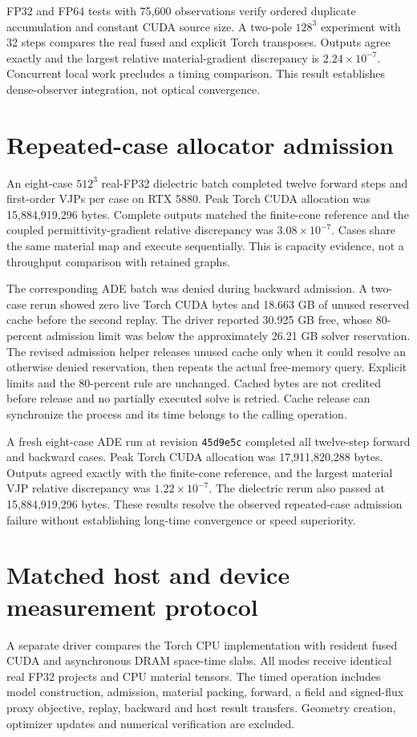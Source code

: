 \documentclass[11pt,a4paper]{article}
\begin{document}
FP32 and FP64 tests with 75,600 observations verify ordered duplicate
accumulation and constant CUDA source size. A two-pole $128^3$ experiment
with 32 steps compares the real fused and explicit Torch transposes. Outputs
agree exactly and the largest relative material-gradient discrepancy is
$2.24\times10^{-7}$. Concurrent local work precludes a timing comparison.
This result establishes dense-observer integration, not optical convergence.


\section{Repeated-case allocator admission}
An eight-case $512^3$ real-FP32 dielectric batch completed twelve forward steps
and first-order VJPs per case on RTX 5880. Peak Torch CUDA allocation was
15,884,919,296 bytes. Complete outputs matched the finite-cone reference and
the coupled permittivity-gradient relative discrepancy was
$3.08\times10^{-7}$. Cases share the same material map and execute sequentially.
This is capacity evidence, not a throughput comparison with retained graphs.

The corresponding ADE batch was denied during backward admission. A two-case
rerun showed zero live Torch CUDA bytes and 18.663 GB of unused reserved cache
before the second replay. The driver reported 30.925 GB free, whose 80-percent
admission limit was below the approximately 26.21 GB solver reservation.
The revised admission helper releases unused cache only when it could resolve
an otherwise denied reservation, then repeats the actual free-memory query.
Explicit limits and the 80-percent rule are unchanged. Cached bytes are not
credited before release and no partially executed solve is retried. Cache
release can synchronize the process and its time belongs to the calling operation.

A fresh eight-case ADE run at revision \texttt{45d9e5c} completed all twelve-step
forward and backward cases. Peak Torch CUDA allocation was 17,911,820,288 bytes.
Outputs agreed exactly with the finite-cone reference, and the largest material
VJP relative discrepancy was $1.22\times10^{-7}$. The dielectric rerun also
passed at 15,884,919,296 bytes. These results resolve the observed repeated-case
admission failure without establishing long-time convergence or speed superiority.


\section{Matched host and device measurement protocol}
A separate driver compares the Torch CPU implementation with resident fused
CUDA and asynchronous DRAM space-time slabs. All modes receive identical real
FP32 projects and CPU material tensors. The timed operation includes model
construction, admission, material packing, forward, a field and signed-flux
proxy objective, replay, backward and host result transfers. Geometry creation,
optimizer updates and numerical verification are excluded.
\end{document}
